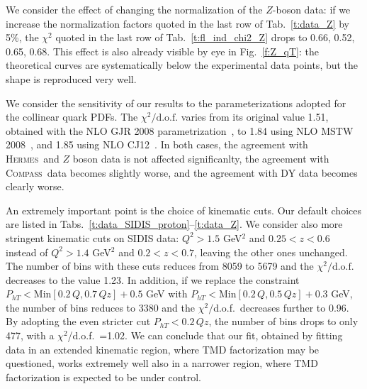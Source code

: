 \documentclass[aps,preprintnumbers,showpacs,nofootinbib,superscriptaddress,floatfix]{revtex4}
\newcommand{\hermes}{\textsc{Hermes}}
\newcommand{\compass}{\textsc{Compass}}
\begin{document}
We consider the effect of changing the normalization of the $Z$-boson
data: if we increase the normalization factors quoted
in the last row of Tab.~\ref{t:data_Z} by 5\%, the $\chi^2$ quoted in the last
row of Tab.~\ref{t:fl_ind_chi2_Z}
drops to 0.66, 
0.52, 0.65, 0.68. This effect is
also already visible by eye in Fig.~\ref{f:Z_qT}: the theoretical curves are
systematically below the experimental data points, but the shape is reproduced
very well.

We consider the sensitivity of our results to the %
 parameterizations adopted for the collinear quark PDFs. 
The $\chi^2/ \text{d.o.f.}$ varies from its original value
1.51, obtained with the NLO GJR 2008 parametrization~\cite{Gluck:2007ck}, to
1.84 using NLO MSTW 2008~\cite{Martin:2009iq}, and 1.85 using NLO
CJ12~\cite{Owens:2012bv}. In both cases, the agreement with \hermes\
and $Z$ boson data is not affected significanlty,
 the agreement with \compass\ data becomes slightly worse, 
and the agreement with DY data becomes clearly worse. 

An extremely important point is the choice of kinematic cuts. Our default
choices are listed in Tabs.~\ref{t:data_SIDIS_proton}--\ref{t:data_Z}. We
consider also more stringent kinematic cuts on SIDIS data: 
$Q^2 > 1.5$ GeV$^2$ and 
$0.25 < z < 0.6$ instead of $Q^2 > 1.4$ GeV$^2$ and $0.2 < z <
0.7$, leaving the other ones unchanged. The number of bins with these cuts 
reduces from 8059 to 5679 and 
the  $\chi^2/ \text{d.o.f.}$  decreases to the
value 1.23. 
In addition, if we replace the constraint  $P_{h T} < \text{Min} [
0.2\, Q, 0.7\, Q z] + 0.5$ GeV  
with $P_{h T} < \text{Min} [ 0.2\, Q, 0.5\, Q z] +
0.3$ GeV, the number of bins reduces to 3380 and the $\chi^2/$d.o.f.\ decreases
further to 0.96. By adopting the even stricter 
cut $P_{h T} < 0.2\, Q z$, 
the number of bins drops to only 477, with  a 
 $\chi^2$/d.o.f.\ =1.02.  We can conclude that our fit, obtained by
 fitting data in an extended kinematic region, where TMD factorization may be
 questioned,  works extremely well also in a narrower
 region, where TMD factorization is expected to be under control.


%
%
\end{document}
